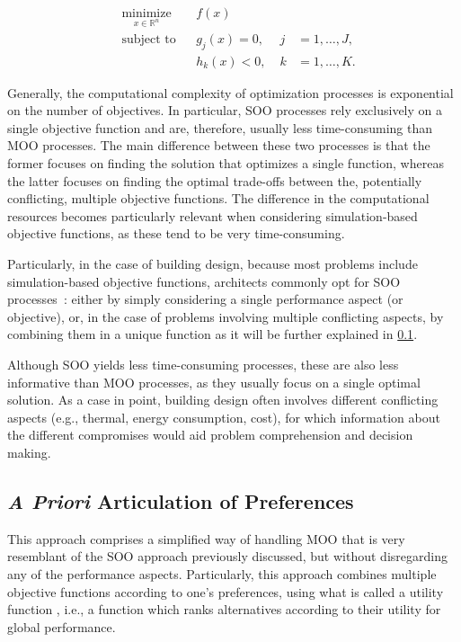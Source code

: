 	\begin{equation} \label{eq:soo}
	\begin{aligned}
	& \underset{x \in \mathbb{R}^n}{\text{minimize}}
	& & f(x) \\
	& \text{subject to}
	& & g_j(x) = 0, & \; j &= 1, \ldots, J, \\ 
	&&& h_k(x) < 0, & \; k &= 1, \ldots, K.
	\end{aligned}
	\end{equation}
	
	Generally, the computational complexity of optimization processes is exponential on the number of objectives. In particular, \ac{SOO} processes rely exclusively on a single objective function and are, therefore, usually less time-consuming than \ac{MOO} processes. The main difference between these two processes is that the former focuses on finding the solution that optimizes a single function, whereas the latter focuses on finding the optimal trade-offs between the, potentially conflicting, multiple objective functions. The difference in the computational resources becomes particularly relevant when considering simulation-based objective functions, as these tend to be very time-consuming. 
	
	Particularly, in the case of building design, because most problems include simulation-based objective functions, architects commonly opt for \ac{SOO} processes~\cite{Wortmann2017Opossum}: either by simply considering a single performance aspect (or objective), or, in the case of problems involving multiple conflicting aspects, by combining them in a unique function as it will be further explained in \cref{ssec:preferencesarticulation}.
		
	Although \ac{SOO} yields less time-consuming processes, these are also less informative than \ac{MOO} processes, as they usually focus on a single optimal solution. As a case in point, building design often involves different conflicting aspects (e.g., thermal, energy consumption, cost), for which information about the different compromises would aid problem comprehension and decision making.
	
	\subsection{\textit{A Priori} Articulation of Preferences}
	\label{ssec:preferencesarticulation}
	
	This approach comprises a simplified way of handling \ac{MOO} that is very resemblant of the \ac{SOO} approach previously discussed, but without disregarding any of the performance aspects. Particularly, this approach combines multiple objective functions according to one’s preferences, using what is called a utility function \cite{Marler2004}, i.e., a function which ranks alternatives according to their utility for global performance. 
	
